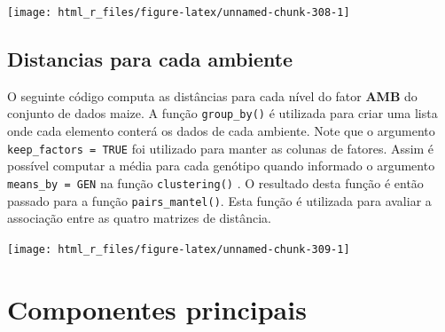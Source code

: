 \documentclass[
]{book}
\newenvironment{Shaded}{\begin{snugshade}}{\end{snugshade}}
\newcommand{\DataTypeTok}[1]{\textcolor[rgb]{0.13,0.29,0.53}{#1}}
\newcommand{\DecValTok}[1]{\textcolor[rgb]{0.00,0.00,0.81}{#1}}
\newcommand{\KeywordTok}[1]{\textcolor[rgb]{0.13,0.29,0.53}{\textbf{#1}}}
\newcommand{\NormalTok}[1]{#1}
\newcommand{\OperatorTok}[1]{\textcolor[rgb]{0.81,0.36,0.00}{\textbf{#1}}}
\newcommand{\StringTok}[1]{\textcolor[rgb]{0.31,0.60,0.02}{#1}}
\begin{document}
\begin{center}\texttt{[image: html\_r\_files/figure-latex/unnamed-chunk-308-1]} \end{center}

\hypertarget{distancias-para-cada-ambiente}{%
\subsection{Distancias para cada ambiente}\label{distancias-para-cada-ambiente}}

O seguinte código computa as distâncias para cada nível do fator \textbf{AMB} do conjunto de dados maize. A função \texttt{group\_by()}  é utilizada para criar uma lista onde cada elemento conterá os dados de cada ambiente. Note que o argumento \texttt{keep\_factors\ =\ TRUE} foi utilizado para manter as colunas de fatores. Assim é possível computar a média para cada genótipo quando informado o argumento \texttt{means\_by\ =\ GEN} na função \texttt{clustering()} . O resultado desta função é então passado para a função \texttt{pairs\_mantel()}.  Esta função é utilizada para avaliar a associação entre as quatro matrizes de distância.

\begin{Shaded}
\end{Shaded}

\begin{center}\texttt{[image: html\_r\_files/figure-latex/unnamed-chunk-309-1]} \end{center}

\hypertarget{componentes-principais}{%
\section{Componentes principais}\label{componentes-principais}}
\end{document}
